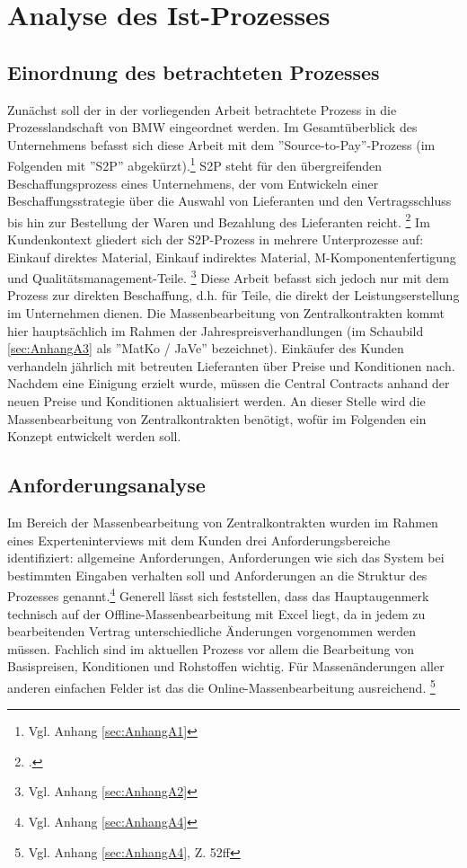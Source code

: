 \chapter{Analyse des Ist-Prozesses}

\section{Einordnung des betrachteten Prozesses}

Zunächst soll der in der vorliegenden Arbeit betrachtete Prozess in die Prozesslandschaft von BMW eingeordnet werden. Im Gesamtüberblick des Unternehmens befasst sich diese Arbeit mit dem ''Source-to-Pay''-Prozess (im Folgenden mit ''S2P'' abgekürzt).\footnote{Vgl. Anhang \ref{sec:AnhangA1}} S2P steht für den übergreifenden Beschaffungsprozess eines Unternehmens, der vom Entwickeln einer Beschaffungsstrategie über die Auswahl von Lieferanten und den Vertragsschluss bis hin zur Bestellung der Waren und Bezahlung des Lieferanten reicht. \footcite[Vgl.][S. 3]{praxis_jain_source_pay_definition_2017} Im Kundenkontext gliedert sich der S2P-Prozess in mehrere Unterprozesse auf: Einkauf direktes Material, Einkauf indirektes Material, M-Komponentenfertigung und Qualitätsmanagement-Teile. \footnote{Vgl. Anhang \ref{sec:AnhangA2}} Diese Arbeit befasst sich jedoch nur mit dem Prozess zur direkten Beschaffung, d.h. für Teile, die direkt der Leistungserstellung im Unternehmen dienen. Die Massenbearbeitung von Zentralkontrakten kommt hier hauptsächlich im Rahmen der Jahrespreisverhandlungen (im Schaubild \ref{sec:AnhangA3} als ''MatKo / JaVe'' bezeichnet). Einkäufer des Kunden verhandeln jährlich mit betreuten Lieferanten über Preise und Konditionen nach. Nachdem eine Einigung erzielt wurde, müssen die Central Contracts anhand der neuen Preise und Konditionen aktualisiert werden. An dieser Stelle wird die Massenbearbeitung von Zentralkontrakten benötigt, wofür im Folgenden ein Konzept entwickelt werden soll.

\section{Anforderungsanalyse}

Im Bereich der Massenbearbeitung von Zentralkontrakten wurden im Rahmen eines Experteninterviews mit dem Kunden drei Anforderungsbereiche identifiziert: allgemeine Anforderungen, Anforderungen wie sich das System bei bestimmten Eingaben verhalten soll und Anforderungen an die Struktur des Prozesses genannt.\footnote{Vgl. Anhang \ref{sec:AnhangA4}} Generell lässt sich feststellen, dass das Hauptaugenmerk technisch auf der Offline-Massenbearbeitung mit Excel liegt, da in jedem zu bearbeitenden Vertrag unterschiedliche Änderungen vorgenommen werden müssen. Fachlich sind im aktuellen Prozess vor allem die Bearbeitung von Basispreisen, Konditionen und Rohstoffen wichtig. Für Massenänderungen aller anderen einfachen Felder ist das die Online-Massenbearbeitung ausreichend. \footnote{Vgl. Anhang \ref{sec:AnhangA4}, Z. 52ff}

